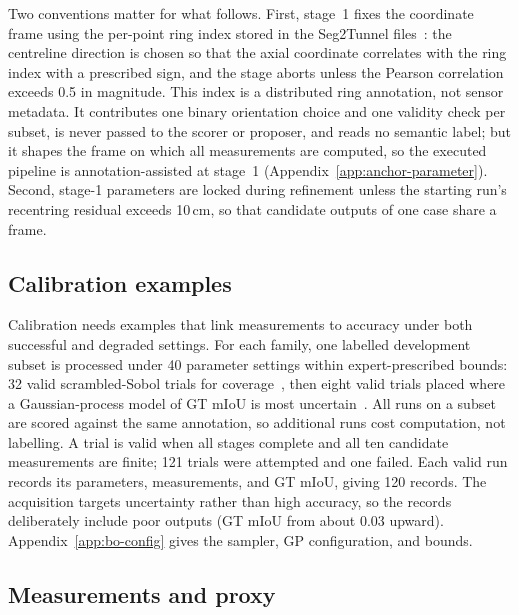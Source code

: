 \documentclass[a4paper,fleqn]{cas-dc}
\begin{document}
Two conventions matter for what follows. First, stage~1 fixes the coordinate frame using the per-point ring index stored in the Seg2Tunnel files~\cite{lin2024seg2tunnel}: the centreline direction is chosen so that the axial coordinate correlates with the ring index with a prescribed sign, and the stage aborts unless the Pearson correlation exceeds 0.5 in magnitude. This index is a distributed ring annotation, not sensor metadata. It contributes one binary orientation choice and one validity check per subset, is never passed to the scorer or proposer, and reads no semantic label; but it shapes the frame on which all measurements are computed, so the executed pipeline is annotation-assisted at stage~1 (Appendix~\ref{app:anchor-parameter}). Second, stage-1 parameters are locked during refinement unless the starting run's recentring residual exceeds 10\,cm, so that candidate outputs of one case share a frame.

\subsection{Calibration examples}
\label{sec:bo-experience}

Calibration needs examples that link measurements to accuracy under both successful and degraded settings. For each family, one labelled development subset is processed under 40 parameter settings within expert-prescribed bounds: 32 valid scrambled-Sobol trials for coverage~\cite{joe2008constructing}, then eight valid trials placed where a Gaussian-process model of GT mIoU is most uncertain~\cite{gramacy2009adaptive,gramacy2020surrogates}. All runs on a subset are scored against the same annotation, so additional runs cost computation, not labelling. A trial is valid when all stages complete and all ten candidate measurements are finite; 121 trials were attempted and one failed. Each valid run records its parameters, measurements, and GT mIoU, giving 120 records. The acquisition targets uncertainty rather than high accuracy, so the records deliberately include poor outputs (GT mIoU from about 0.03 upward). Appendix~\ref{app:bo-config} gives the sampler, GP configuration, and bounds.

\subsection{Measurements and proxy}
\label{sec:features}
\end{document}

